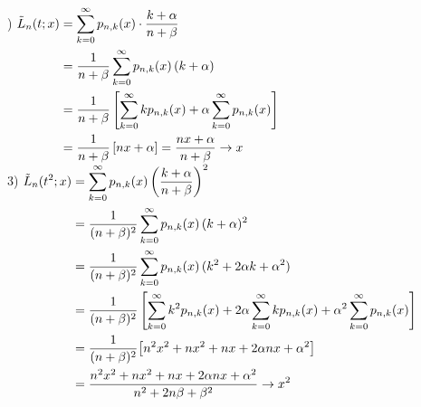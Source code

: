 \newpage
\begin{english}
	) $
	\begin{aligned}[t]
		\tilde{L}_n(t; x) &= \sum_{k=0}^{\infty} p_{n, k}(x) \cdot \frac{k+\alpha}{n+\beta}\\
		&= \frac{1}{n+\beta} \sum_{k=0}^{\infty} p_{n, k}(x)\, (k+\alpha)\\
		&= \frac{1}{n+\beta} \left[\sum_{k=0}^{\infty}k p_{n, k}(x)  +\alpha \sum_{k=0}^{\infty} p_{n, k}(x) \right]\\
		&= \frac{1}{n+\beta} \left[nx + \alpha\right] = \frac{nx + \alpha}{n + \beta}\to x
	\end{aligned}$\\[20pt]
	3) $
	\begin{aligned}[t]
		\tilde{L}_n(t^2; x) &= \sum_{k=0}^{\infty} p_{n, k}(x)  \left(\frac{k+\alpha}{n + \beta}\right)^2\\
		&= \frac{1}{(n+\beta)^2} \sum_{k=0}^{\infty} p_{n, k}(x) \,(k+\alpha)^2\\
		&= \frac{1}{(n+\beta)^2} \sum_{k=0}^{\infty} p_{n, k}(x) \,(k^2+2\alpha k + \alpha^2)\\
		&= \frac{1}{(n+\beta)^2} \left[\sum_{k=0}^{\infty}k^2 p_{n, k}(x)  +2\alpha \sum_{k=0}^{\infty} kp_{n, k}(x)  +\alpha^2 \sum_{k=0}^{\infty} p_{n, k}(x) \right]\\
		&= \frac{1}{(n+\beta)^2} \big[n^2x^2 + nx^2 + nx + 2\alpha n x+ \alpha^2\big]\\
		&= \frac{n^2x^2 + nx^2 + nx + 2\alpha n x+ \alpha^2}{n^2 + 2n\beta + \beta^2} \to x^2
	\end{aligned}$
\end{english}






